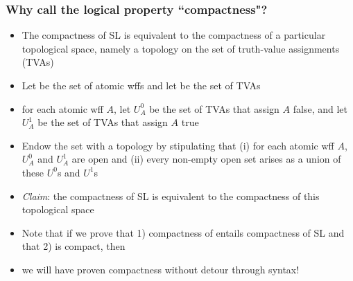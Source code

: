 \begin{frame}
\frametitle{Why call the logical property ``compactness"?}

\begin{itemize}[<+->]

\item The compactness of SL is equivalent to the compactness of a particular topological space, namely a topology on the set of truth-value assignments (TVAs)

\item Let  be the set of atomic wffs and let  be the set of TVAs

\item for each atomic wff $A$, let \emph{$U^0_A$} be the set of TVAs that assign $A$ false, and let \emph{$U^1_A$} be the set of TVAs that assign $A$ true

\item Endow the set  with a topology by stipulating that (i) for each atomic wff $A$, $U^0_A$ and $U^1_A$ are open and (ii) every non-empty open set arises as a union of these $U^0$s and $U^1$s 



\item \emph{Claim}: the compactness of SL is equivalent to the compactness of this topological space 

\item Note that if we prove that 1) compactness of  entails compactness of SL and that 2)  is compact, then 
\item[] we will have proven compactness without detour through syntax!


\end{itemize}
\end{frame}

